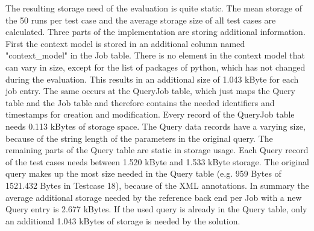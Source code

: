 \documentclass[draft,final]{vutinfth} %
\begin{document}
The resulting storage need of the evaluation is quite static. The mean storage of the 50 runs per test case and the average storage size of all test cases are calculated. Three parts of the implementation are storing additional information. First the context model is stored in an additional column named "context\_model" in the Job table. There is no element in the context model that can vary in size, except for the list of packages of python, which has not changed during the evaluation. This results in an additional size of 1.043 kByte for each job entry. The same occurs at the QueryJob table, which just maps the Query table and the Job table and therefore contains the needed identifiers and timestamps for creation and modification. Every record of the QueryJob table needs 0.113 kBytes of storage space. The Query data records have a varying size, because of the string length of the parameters in the original query. The remaining parts of the Query table are static in storage usage. Each Query record of the test cases needs between 1.520 kByte and 1.533 kByte storage. The original query makes up the most size needed in the Query table (e.g. 959 Bytes of 1521.432 Bytes in Testcase 18), because of the XML annotations. In summary the average additional storage needed by the reference back end per Job with a new Query entry is 2.677 kBytes. If the used query is already in the Query table, only an additional 1.043 kBytes of storage is needed by the solution. 
\end{document}
